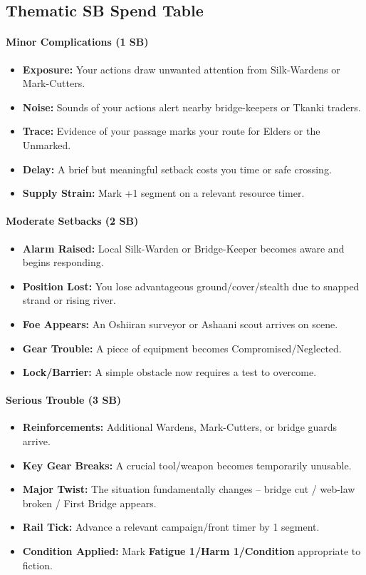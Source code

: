 \subsection*{Thematic SB Spend Table}
\label{sec:lethaiar-sb}

\paragraph{Minor Complications (1 SB)}
\begin{itemize}
\item \textbf{Exposure:} Your actions draw unwanted attention from Silk-Wardens or Mark-Cutters.
\item \textbf{Noise:} Sounds of your actions alert nearby bridge-keepers or Tkanki traders.
\item \textbf{Trace:} Evidence of your passage marks your route for Elders or the Unmarked.
\item \textbf{Delay:} A brief but meaningful setback costs you time or safe crossing.
\item \textbf{Supply Strain:} Mark +1 segment on a relevant resource timer.
\end{itemize}

\paragraph{Moderate Setbacks (2 SB)}
\begin{itemize}
\item \textbf{Alarm Raised:} Local Silk-Warden or Bridge-Keeper becomes aware and begins responding.
\item \textbf{Position Lost:} You lose advantageous ground/cover/stealth due to snapped strand or rising river.
\item \textbf{Foe Appears:} An Oshiiran surveyor or Ashaani scout arrives on scene.
\item \textbf{Gear Trouble:} A piece of equipment becomes Compromised/Neglected.
\item \textbf{Lock/Barrier:} A simple obstacle now requires a test to overcome.
\end{itemize}

\paragraph{Serious Trouble (3 SB)}
\begin{itemize}
\item \textbf{Reinforcements:} Additional Wardens, Mark-Cutters, or bridge guards arrive.
\item \textbf{Key Gear Breaks:} A crucial tool/weapon becomes temporarily unusable.
\item \textbf{Major Twist:} The situation fundamentally changes -- bridge cut / web-law broken / First Bridge appears.
\item \textbf{Rail Tick:} Advance a relevant campaign/front timer by 1 segment.
\item \textbf{Condition Applied:} Mark \textbf{Fatigue 1/Harm 1/Condition} appropriate to fiction.
\end{itemize}

